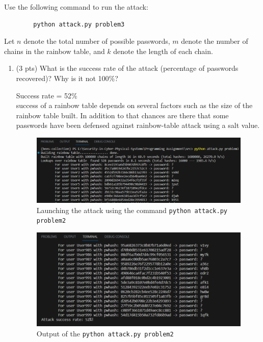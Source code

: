 \documentclass[11pt,letterpaper]{article}
\newenvironment{answer}{\em \color{blue} \begin{adjustwidth}{1cm}{1cm}}{\end{adjustwidth}}
\begin{document}
	Use the following command to run the attack:
	\begin{Verbatim}
		python attack.py problem3
	\end{Verbatim}
	
	Let $n$ denote the total number of possible passwords, $m$ denote the number of chains in the rainbow table, and $k$ denote the length of each chain.
	
	\begin{enumerate}
		\item (3 pts) What is the success rate of the attack (percentage of passwords recovered)? Why is it not 100\%?
		
		\begin{answer}
			
			Success rate = 52\%\\
			
			success of a rainbow table depends on several factors such as the size of the rainbow table built. In addition to that chances are there that some passwords have been defensed against rainbow-table attack using a salt value.
			
			\begin{figure}[H]
				\centering
				\includegraphics[width=0.7\columnwidth]{images/p3/q11.png}
				\caption{Launching the attack using the command {\tt python attack.py problem2}}
			\end{figure}
		
			\begin{figure}[H]
				\centering
				\includegraphics[width=0.7\columnwidth]{images/p3/q12.png}
				\caption{Output of the {\tt python attack.py problem2}}
			\end{figure}
			
		\end{answer}
		

\end{enumerate}
\end{document}
